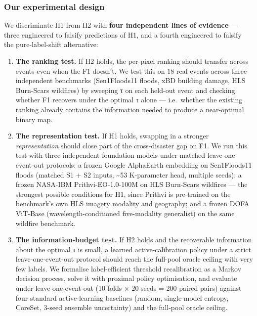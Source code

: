 \subsubsection{Our experimental design}\label{our-experimental-design}

We discriminate H1 from H2 with \textbf{four independent lines of evidence} ---
three engineered to falsify predictions of H1, and a fourth engineered
to falsify the pure-label-shift alternative:

\begin{enumerate}
\def\labelenumi{\arabic{enumi}.}
\item
  \textbf{The ranking test.} If H2 holds, the per-pixel ranking should
  transfer across events even when the F1 doesn't. We test this on
  18 real events across three independent benchmarks (Sen1Floods11
  floods, xBD building damage, HLS Burn-Scars wildfires) by sweeping τ
  on each held-out event and checking whether F1 recovers under the
  optimal τ alone --- i.e.~whether the existing ranking already contains
  the information needed to produce a near-optimal binary map.
\item
  \textbf{The representation test.} If H1 holds, swapping in a stronger
  \emph{representation} should close part of the cross-disaster gap on F1.
  We run this test with three independent foundation models under
  matched leave-one-event-out protocols: a frozen Google AlphaEarth
  embedding on Sen1Floods11 floods (matched S1 + S2 inputs,
  \textasciitilde53 K-parameter head, multiple seeds); a frozen NASA-IBM
  Prithvi-EO-1.0-100M on HLS Burn-Scars wildfires --- the strongest
  possible conditions for H1, since Prithvi is pre-trained on the
  benchmark's own HLS imagery modality and geography; and a frozen
  DOFA ViT-Base (wavelength-conditioned five-modality generalist) on
  the same wildfire benchmark.
\item
  \textbf{The information-budget test.} If H2 holds and the recoverable
  information about the optimal τ is small, a learned active-calibration
  policy under a strict leave-one-event-out protocol should reach the
  full-pool oracle ceiling with very few labels. We formalise
  label-efficient threshold recalibration as a Markov decision process,
  solve it with proximal policy optimisation, and evaluate under
  leave-one-event-out (10 folds × 20 seeds = 200 paired pairs) against
  four standard active-learning baselines (random, single-model
  entropy, CoreSet, 3-seed ensemble uncertainty) and the full-pool
  oracle ceiling.
\end{enumerate}

